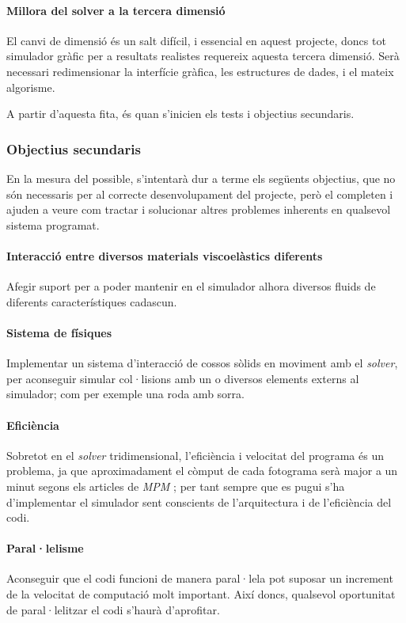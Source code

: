 \documentclass[a4paper]{article} %
\begin{document}
	\paragraph{\quad Millora del solver a la tercera dimensió} El canvi de dimensió és un salt difícil, i essencial en aquest projecte, doncs tot simulador gràfic per a resultats realistes requereix aquesta tercera dimensió. Serà necessari redimensionar la interfície gràfica, les estructures de dades, i el mateix algorisme.
	\par
	A partir d'aquesta fita, és quan s'inicien els tests i objectius secundaris.
	
	\subsubsection{Objectius secundaris} En la mesura del possible, s'intentarà dur a terme els següents objectius, que no són necessaris per al correcte desenvolupament del projecte, però el completen i ajuden a veure com tractar i solucionar altres problemes inherents en qualsevol sistema programat.
	\paragraph[Interacció viscoelàstica]{\qquad Interacció entre diversos materials viscoelàstics diferents} Afegir suport per a poder mantenir en el simulador alhora diversos fluids de diferents característiques cadascun.
	\paragraph[Sistema de físiques]{\qquad Sistema de físiques} Implementar un sistema d'interacció de cossos sòlids en moviment amb el \textit{solver}, per aconseguir simular col·lisions amb un o diversos elements externs al simulador; com per exemple una roda amb sorra.
	\paragraph[Eficiència]{\qquad Eficiència} Sobretot en el \textit{solver} tridimensional, l'eficiència i velocitat del programa és un problema, ja que aproximadament el còmput de cada fotograma serà major a un minut segons els articles de \textit{MPM} \cite{hu2018mlsmpmcpic}; per tant sempre que es pugui s'ha d'implementar el simulador sent conscients de l'arquitectura i de l'eficiència del codi.
	\paragraph[Paral·lelisme]{\qquad  Paral·lelisme} Aconseguir que el codi funcioni de manera paral·lela pot suposar un increment de la velocitat de computació molt important. Així doncs, qualsevol oportunitat de paral·lelitzar el codi s'haurà d'aprofitar.
	
\end{document}
